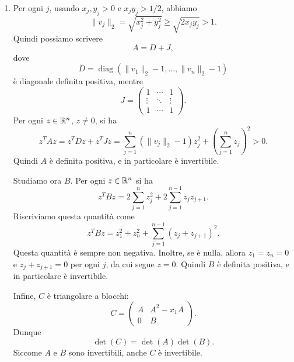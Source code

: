 \documentclass[a4paper]{article}
\begin{document}
\begin{snippetsolution}{}
    \begin{enumerate}
        \item Per ogni \(j\), usando \(x_j,y_j>0\) e \(x_jy_j > 1/2\), abbiamo
            \[
                \|v_j\|_2
                =
                \sqrt{x_j^2+y_j^2}
                \geq
                \sqrt{2x_jy_j}
                >
                1.
            \]
            Quindi possiamo scrivere
            \[
                A = D + J,
            \]
            dove
            \[
                D =
                \operatorname{diag}(\|v_1\|_2-1,\ldots,\|v_n\|_2-1)
            \]
            è diagonale definita positiva, mentre
            \[
                J =
                \begin{pmatrix}
                    1 & \cdots & 1 \\
                    \vdots & \ddots & \vdots \\
                    1 & \cdots & 1
                \end{pmatrix}.
            \]
            Per ogni \(z \in \mathbb{R}^n\), \(z \neq 0\), si ha
            \[
                z^TAz
                =
                z^TDz + z^TJz
                =
                \sum_{j=1}^n(\|v_j\|_2-1)z_j^2
                +
                \left(\sum_{j=1}^n z_j\right)^2
                >
                0.
            \]
            Quindi \(A\) è definita positiva, e in particolare è invertibile.

            Studiamo ora \(B\). Per ogni \(z \in \mathbb{R}^n\) si ha
            \[
                z^TBz
                =
                2\sum_{j=1}^n z_j^2
                +
                2\sum_{j=1}^{n-1} z_jz_{j+1}.
            \]
            Riscriviamo questa quantità come
            \[
                z^TBz
                =
                z_1^2 + z_n^2
                +
                \sum_{j=1}^{n-1}(z_j+z_{j+1})^2.
            \]
            Questa quantità è sempre non negativa. Inoltre, se è nulla, allora
            \(z_1 = z_n = 0\) e \(z_j+z_{j+1}=0\) per ogni \(j\), da cui segue
            \(z=0\). Quindi \(B\) è definita positiva, e in particolare è invertibile.

            Infine, \(C\) è triangolare a blocchi:
            \[
                C =
                \begin{pmatrix}
                    A & A^2 - x_1A \\
                    0 & B
                \end{pmatrix}.
            \]
            Dunque
            \[
                \det(C) = \det(A)\det(B).
            \]
            Siccome \(A\) e \(B\) sono invertibili, anche \(C\) è invertibile.


\end{enumerate}
\end{snippetsolution}
\end{document}
